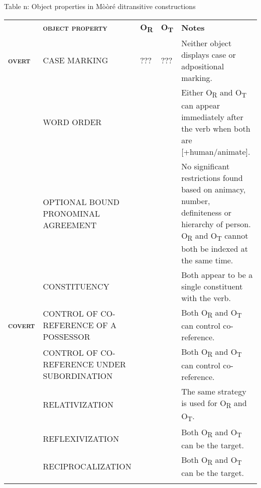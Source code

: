 \documentclass[output=paper]{langsci/langscibook}
\begin{document}
\begin{table}\caption{
\label{bkm:Ref444780947}Table n: Object properties in Mòòré ditransitive constructions
}\end{table}

\begin{tabularx}{\textwidth}{XXXXX} & \textbf{\textsc{object property}} & \textbf{O}\textbf{\textsubscript{R}} & \textbf{O}\textbf{\textsubscript{T}} & \textbf{Notes}\\
\lsptoprule
{ \textbf{\textsc{overt}}} & CASE MARKING & ??? & ??? & Neither object displays case or adpositional marking.\\
& WORD ORDER & 

 & 

 & Either O\textsubscript{R} and O\textsubscript{T} can appear immediately after the verb when both are [+human/animate]. \\
\hhline{~----} & OPTIONAL BOUND PRONOMINAL AGREEMENT & 

 & 

 & No significant restrictions found based on animacy, number, definiteness or hierarchy of person. O\textsubscript{R} and O\textsubscript{T} cannot both be indexed at the same time.\\
\hhline{~----} & CONSTITUENCY & 

 & 

 & Both appear to be a single constituent with the verb.\\
{ \textbf{\textsc{covert}}} & CONTROL OF CO-REFERENCE OF A POSSESSOR & 

 & 

 & Both O\textsubscript{R }and O\textsubscript{T} can control co-reference.\\
& CONTROL OF CO-REFERENCE UNDER SUBORDINATION & 

 & 

 & Both O\textsubscript{R }and O\textsubscript{T} can control co-reference.\\
\hhline{~----} & RELATIVIZATION & 

 & 

 & The same strategy is used for O\textsubscript{R} and O\textsubscript{T}.\\
\hhline{~----} & REFLEXIVIZATION & 

 & 

 & Both O\textsubscript{R }and O\textsubscript{T }can be the target.\\
\hhline{~----} & RECIPROCALIZATION & 

 & 

 & Both O\textsubscript{R }and O\textsubscript{T }can be the target.\\
\hhline{~----}
\lspbottomrule
\end{tabularx}
\end{document}
